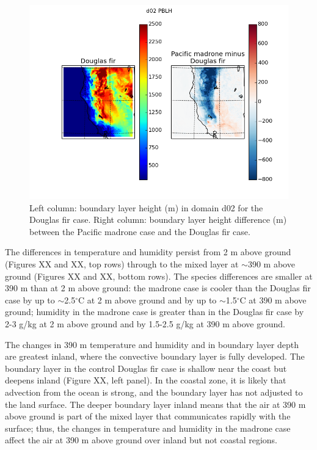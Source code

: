 \begin{figure}[here]
\includegraphics[width=1\textwidth]{ch2-BL/figures/PBLH_d02_s0pt08.png}
\caption{Left column: boundary layer height (m) in domain d02 for the Douglas fir case.  Right column: boundary layer height difference (m) between the Pacific madrone case and the Douglas fir case.}
\label{fig:BL_WRFmapPBLH}
\end{figure}

The differences in temperature and humidity persist from 2 m above ground (Figures XX and XX, top rows) through to the mixed layer at $\sim$390 m above ground (Figures XX and XX, bottom rows). The species differences are smaller at 390 m than at 2 m above ground: the madrone case is cooler than the Douglas fir case by up to $\sim$2.5$^\circ$C at 2 m above ground and by up to $\sim$1.5$^\circ$C at 390 m above ground; humidity in the madrone case is greater than in the Douglas fir case by 2-3 g/kg at 2 m above ground and by 1.5-2.5 g/kg at 390 m above ground.

The changes in 390 m temperature and humidity and in boundary layer depth are greatest inland, where the convective boundary layer is fully developed.  The boundary layer in the control Douglas fir case is shallow near the coast but deepens inland (Figure XX, left panel).  In the coastal zone, it is likely that advection from the ocean is strong, and the boundary layer has not adjusted to the land surface.  The deeper boundary layer inland means that the air at 390 m above ground is part of the mixed layer that communicates rapidly with the surface; thus, the changes in temperature and humidity in the madrone case affect the air at 390 m above ground over inland but not coastal regions.



